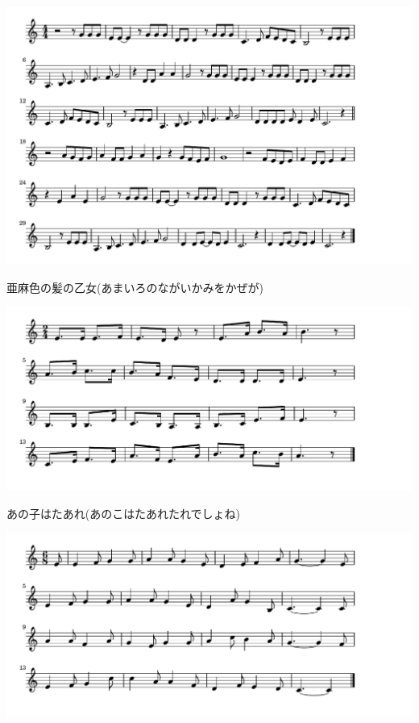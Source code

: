 \documentclass[a4paper]{ltjsarticle}
\begin{document}
\vspace{10mm}

\includegraphics[clip]{amaironokami_crop.pdf}

\vspace{-10mm}

\parindent=50pt 
亜麻色の髪の乙女(あまいろのながいかみをかぜが)
\parindent=10pt

\vspace{10mm}

\includegraphics[clip]{anokowatare_crop.pdf}

\vspace{-10mm}

\parindent=50pt 
あの子はたあれ(あのこはたあれたれでしょね)
\parindent=10pt

\vspace{10mm}

\includegraphics[clip]{aogeba_crop.pdf}
\end{document}
